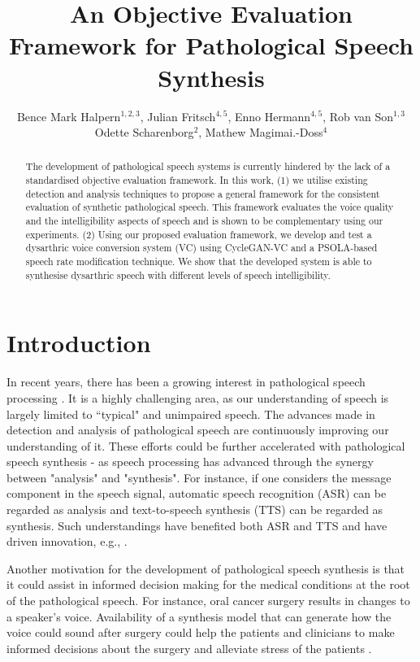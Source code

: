 \documentclass[a4paper]{article}
\title{An Objective Evaluation Framework for Pathological Speech Synthesis}
\author{Bence Mark Halpern$^{1,2,3}$, Julian Fritsch$^{4,5}$, Enno Hermann$^{4,5}$, Rob van Son$^{1,3}$ Odette Scharenborg$^{2}$, Mathew Magimai.-Doss$^{4}$}
\begin{document}
\maketitle

\begin{abstract}
The development of pathological speech systems is currently hindered by the lack of a standardised objective evaluation framework. In this work, (1) we utilise existing detection and analysis techniques to propose a general framework for the consistent evaluation of synthetic pathological speech. This framework evaluates the voice quality and the intelligibility aspects of speech and is shown to be complementary using our experiments. (2) Using our proposed evaluation framework, we develop and test a dysarthric voice conversion system (VC) using CycleGAN-VC and a PSOLA-based speech rate modification technique. We show that the developed system is able to synthesise dysarthric speech with different levels of speech intelligibility.

\end{abstract}


\section{Introduction}
\label{sec:intro}

In recent years, there has been a growing interest in pathological speech processing \cite{gupta2016pathological}. It is a highly challenging area, as our understanding of speech is largely limited to ``typical" and unimpaired speech. The advances made in detection and analysis of pathological speech are continuously improving our understanding of it. These efforts could be further accelerated with pathological speech synthesis - as speech processing has advanced through the synergy between "analysis" and "synthesis". For instance, if one considers the message component in the speech signal, automatic speech recognition (ASR) can be regarded as analysis and text-to-speech synthesis (TTS) can be regarded as synthesis. Such understandings have 
benefited both ASR and TTS and have driven innovation, e.g., \cite{tokuda_vlbrc_hmm_icassp98, leeVLBRC_2001, Dines_JSTSP_2010, tjandra2017listening}. 

Another motivation for the development of pathological speech synthesis is that it could assist in informed decision making for the medical conditions at the root of the pathological speech. For instance, oral cancer surgery results in changes to a speaker's voice. Availability of a synthesis model that can generate how the voice could sound after surgery could help the patients and clinicians to make informed decisions about the surgery and alleviate stress of the patients \cite{Epstein1999}.
\end{document}

